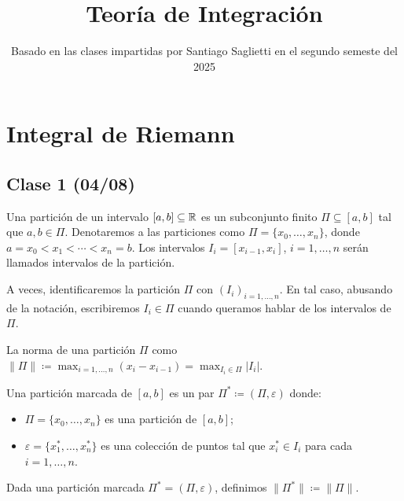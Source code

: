 \documentclass[a4paper]{report}
\title{Teoría de Integración}
\author{}
\date{Basado en las clases impartidas por Santiago Saglietti en el segundo semeste del 2025}
\begin{document}
    \maketitle
    \tableofcontents

    \chapter{Integral de Riemann}
    \setcounter{section}{0}
	\section{Clase 1 (04/08)}

	\begin{definition}
		Una partición de un intervalo $[a,b]\subseteq\mathbb{R}$ es un subconjunto finito $\Pi\subseteq[a,b]$ tal que $a,b\in\Pi$. Denotaremos a las particiones como $\Pi=\{x_0,\dots,x_n\}$, donde $a=x_0<x_1<\cdots<x_n=b$. Los intervalos $I_i=[x_{i-1},x_i]$, $i=1,\dots,n$ serán llamados intervalos de la partición.
	\end{definition}

	\begin{remark}
		A veces, identificaremos la partición $\Pi$ con $(I_i)_{i=1,\dots,n}$. En tal caso, abusando de la notación, escribiremos $I_i\in\Pi$ cuando queramos hablar de los intervalos de $\Pi$.
	\end{remark}

	\begin{definition}
		La norma de una partición $\Pi$ como $\|\Pi\|\coloneqq \max_{i=1,\dots,n}(x_i-x_{i-1})=\max_{I_i\in\Pi}|I_i|$.
	\end{definition}

	\begin{definition}
		Una partición marcada de $[a,b]$ es un par $\Pi^*\coloneqq(\Pi,\varepsilon)$ donde:
		\begin{itemize}
			\item $\Pi = \{x_0,\dots,x_n\}$ es una partición de $[a,b]$;
			\item $\varepsilon = \{x_1^*,\dots,x_n^*\}$ es una colección de puntos tal que $x_i^*\in I_i$ para cada $i=1,\dots,n$.
		\end{itemize}
	\end{definition}

	\begin{remark}
		Dada una partición marcada $\Pi^*=(\Pi,\varepsilon)$, definimos $\|\Pi^*\|\coloneqq \|\Pi\|$.
	\end{remark}
\end{document}
